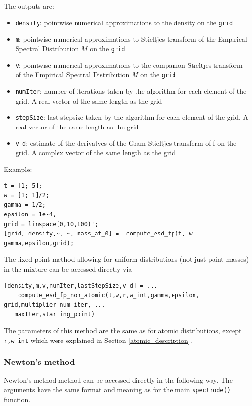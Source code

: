 \documentclass[english,11pt]{article} %
\begin{document}
The outputs are: 

\begin{itemize}
\item \verb+density+: pointwise numerical approximations to the density on the \verb+grid+
\item \verb+m+: pointwise numerical approximations to Stieltjes transform of the Empirical Spectral Distribution $M$ on the \verb+grid+
\item \verb+v+: pointwise numerical approximations to the companion Stieltjes transform of the Empirical Spectral Distribution $M$ on the \verb+grid+
\item \verb+numIter+: number of iterations taken by the algorithm for each element of the grid. A real vector of the same length as the grid
\item \verb+stepSize+: last stepsize taken by the algorithm for each element of
the grid. A real vector of the same length as the grid
\item \verb+v_d+: estimate of the derivatves of the Gram Stieltjes transform of f on the grid. A complex vector of the same length as the grid

\end{itemize}

Example:

\begin{verbatim}
t = [1; 5]; 
w = [1; 1]/2;
gamma = 1/2; 
epsilon = 1e-4;
grid = linspace(0,10,100)';
[grid, density,~, ~, mass_at_0] =  compute_esd_fp(t, w, gamma,epsilon,grid);
\end{verbatim}


The fixed point method allowing for uniform distributions (not just point masses) in the mixture can be accessed directly via

\begin{verbatim}
[density,m,v,numIter,lastStepSize,v_d] = ...
    compute_esd_fp_non_atomic(t,w,r,w_int,gamma,epsilon, grid,multiplier_num_iter, ...
   maxIter,starting_point)
\end{verbatim}

The parameters of this method are the same as for atomic distributions, except \verb+r,w_int+ which were explained in Section \ref{atomic_description}.


\subsubsection{Newton's method}

Newton's method method can be accessed directly in the following way. The arguments have the same format and meaning as for the main \verb+spectrode()+ function. 
\end{document}

